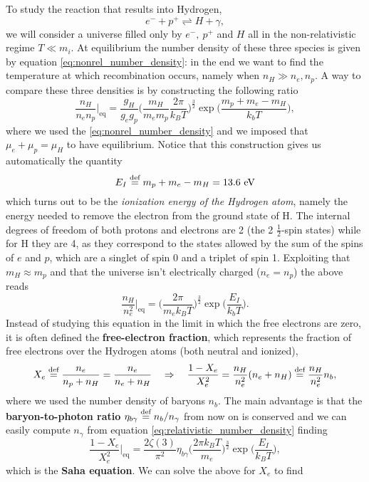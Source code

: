 To study the reaction that results into Hydrogen,
$$
e^-+p^+ \rightleftharpoons H+ \gamma,
$$
we will consider a universe filled only by $e^-,\ p^+$ and $H$ all in the non-relativistic regime $T\ll m_i$. At equilibrium the number density of these three species is given by equation \eqref{eq:nonrel_number_density}: in the end we want to find the temperature at which recombination occurs, namely when $n_H\gg n_e,n_p$. A way to compare these three densities is by constructing the following ratio
$$
\frac{n_H}{n_en_p}\bigg|_\text{eq}=\frac{g_H}{g_eg_p}\bigg(\frac{m_H}{m_em_p}\frac{2\pi}{k_BT}\bigg)^{\frac{3}{2}}\exp\bigg(\frac{m_p+m_e-m_H}{k_bT}\bigg),
$$
where we used the \eqref{eq:nonrel_number_density} and we imposed that $\mu_e+\mu_p=\mu_H$ to have equilibrium. Notice that this construction gives us automatically the quantity
$$
E_I\stackrel{\text{def}}{=} m_p+m_e-m_H=13.6\text{ eV}
$$
which turns out to be the \emph{ionization energy of the Hydrogen atom}, namely the energy needed to remove the electron from the ground state of H. The internal degrees of freedom of both protons and electrons are 2 (the 2 $\tfrac12$-spin states) while for H they are 4, as they correspond to the states allowed by the sum of the spins of $e$ and $p$, which are a singlet of spin 0 and a triplet of spin 1.  Exploiting that $m_H\approx m_p$ and that the universe isn't electrically charged ($n_e=n_p$) the above reads
$$
\frac{n_H}{n_e^2}\bigg|_\text{eq}=\bigg(\frac{2\pi}{m_ek_BT}\bigg)^{\frac{3}{2}}\exp\bigg(\frac{E_I}{k_bT}\bigg).
$$
Instead of studying this equation in the limit in which the free electrons are zero, it is often defined the \textbf{free-electron fraction}, which represents the fraction of free electrons over the Hydrogen atoms (both neutral and ionized),
\begin{equation}
    X_e\stackrel{\text{def}}{=}\frac{n_e}{n_p+n_H}=\frac{n_e}{n_e+n_H}\quad\Rightarrow\quad \frac{1-X_e}{X_e^2}=\frac{n_H}{n^2_e}(n_e+n_H)\stackrel{\text{def}}{=}\frac{n_H}{n^2_e}n_b,
\end{equation}
where we used the number density of baryons $n_b$. The main advantage is that the \textbf{baryon-to-photon ratio} $\eta_{b\gamma}\stackrel{\text{def}}{=} n_b/n_\gamma$ from now on is conserved and we can easily compute $n_\gamma$ from equation \eqref{eq:relativistic_number_density} finding
\begin{equation}
    \frac{1-X_e}{X_e^2}\bigg|_\text{eq}=\frac{2\zeta(3)}{\pi^2}\eta_{b\gamma}\bigg(\frac{2\pi k_BT}{m_e}\bigg)^{\frac{3}{2}}\exp\bigg({\frac{E_I}{k_BT}}\Bigg),\label{eq:Saha}
\end{equation}
which is the \textbf{Saha equation}. We can solve the above for $X_e$ to find

